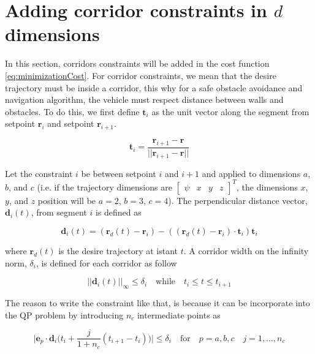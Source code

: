 \section{Adding corridor constraints in \texorpdfstring{$d$}{TEXT} dimensions}

In this section, corridors constraints will be added in the cost function \eqref{eq:minimizationCost}. For corridor constraints, we mean that the desire trajectory must be inside a corridor, this why for a safe obstacle avoidance and navigation algorithm, the vehicle must respect distance between walls and obstacles. To do this, we first define $\mathbf{t}_i$ as the unit vector along the segment from setpoint $\mathbf{r}_i$ and setpoint $\mathbf{r}_{i+1}$.

\begin{equation}
	\mathbf{t}_i=\frac{\mathbf{r}_{i+1}-\mathbf{r}}{||\mathbf{r}_{i+1}-\mathbf{r}||}
	\label{eq:unitVector}
\end{equation}

\noindent Let the constraint $i$ be between setpoint $i$ and $i+1$ and applied to dimensions $a$, $b$, and $c$ (i.e. if the trajectory dimensions are $\begin{bmatrix}\psi & x & y & z \end{bmatrix}^T$, the dimensions $x$, $y$, and $z$ position will be $a=2$, $b=3$, $c=4$).
\noindent The perpendicular distance vector, $\mathbf{d}_i(t)$, from segment $i$ is defined as

\begin{equation}
	\mathbf{d}_i(t) = (\mathbf{r}_d(t)-\mathbf{r}_i)-((\mathbf{r}_d(t)-\mathbf{r}_i)\cdot\mathbf{t}_i)\mathbf{t}_i		
	\label{eq:perpendicularVector}	
\end{equation}

\noindent where $\mathbf{r}_d(t)$ is the desire trajectory at istant $t$. A corridor width on the infinity norm, $\delta_{i}$, is defined for each corridor as follow

\begin{equation}
	\big|\big|\mathbf{d}_i(t)\big|\big|_{\infty}\le\delta_i \quad \text{while} \quad t_i\le t\le t_{i+1}
	\label{eq:corridorWidth}
\end{equation}

\noindent The reason to write the constraint like that, is because it can be incorporate into the QP problem by introducing $n_c$ intermediate points as

\begin{equation}
	\Bigg|\mathbf{e}_p\cdot\mathbf{d}_i\Big(t_i+\frac{j}{1+n_c}(t_{i+1}-t_i)\Big)\Bigg|\le\delta_i \quad \text{for}\quad p=a,b,c \quad j=1,\dots,n_c
	\label{eq:intermediatePoints}
\end{equation}

